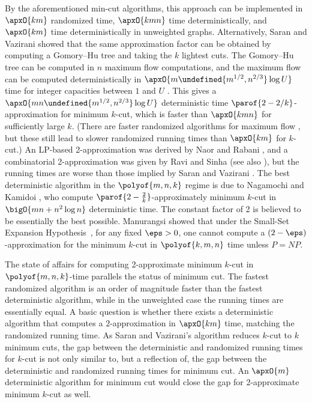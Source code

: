 \documentclass[11pt]{article}
\numberwithin{equation}{section}
\theoremstyle{definition}
\theoremstyle{plain}
\let\minof\undefined\usepackage{math} %
\begin{document}
By the aforementioned min-cut algorithms, this approach can be
implemented in $\apxO{k m}$ randomized time, $\apxO{k m n}$ time
deterministically, and $\apxO{k m}$ time deterministically in
unweighted graphs. Alternatively, Saran and Vazirani \cite{sv-95}
showed that the same approximation factor can be obtained by computing
a Gomory--Hu tree and taking the $k$ lightest cuts. The Gomory--Hu
tree can be computed in $n$ maximum flow computations, and the maximum
flow can be computed deterministically in
\begin{math}
  \apxO{m \minof{m^{1/2}, n^{2/3}} \log U}
\end{math}
time for integer capacities between $1$ and $U$ \cite{gr-98}. This
gives a $\apxO{m n \minof{m^{1/2}, n^{2/3}} \log U}$ deterministic time
$\parof{2 - 2/k}$-approximation for minimum $k$-cut, which is faster
than $\apxO{k m n}$ for sufficiently large $k$. (There are faster
randomized algorithms for maximum flow \cite{ls-14,madry-16}, but
these still lead to slower randomized running times than $\apxO{k m}$
for $k$-cut.) An %
LP-based  %
2-approximation was derived by Naor and
Rabani \cite{nr-01}, and a combinatorial 2-approximation was given by
Ravi and Sinha \cite{rs-08} (see also \cite{barahona-00}), but the
running times are worse than those implied by Saran and Vazirani
\cite{sv-95}. The best deterministic algorithm in the
%
$\polyof{m,n,k}$ %
regime is due to Nagamochi and Kamidoi \cite{nk}, who compute
$\parof{2 - \frac{2}{k}}$-approximately minimum
%
$k$-cut in   %
$\bigO{m n + n^2 \log n}$ deterministic time. The constant factor of 2
is believed to be essentially the best possible.  Manurangsi
\cite{manurangsi-17} showed that under the
%
Small-Set Expansion Hypothesis~\cite{RS10}, %
%
%
for any fixed $\eps > 0$, one cannot compute a
$(2-\eps)$-approximation for the minimum $k$-cut in $\polyof{k,m,n}$
time unless $P = NP$.

The state of affairs for computing 2-approximate minimum
     $k$-cut  %
in $\polyof{m,n,k}$-time parallels the status of minimum cut. The fastest
randomized algorithm is an order of magnitude faster than the fastest
deterministic algorithm, while in the unweighted case the running
times are essentially equal. A basic question is whether there exists
a deterministic algorithm that computes a $2$-approximation in
$\apxO{k m}$ time, matching the randomized running time. As
Saran and Vazirani's algorithm reduces $k$-cut to $k$ minimum cuts,
the gap between the deterministic and randomized running times for
$k$-cut is not only similar to, but a reflection of, the gap between
the deterministic and randomized running times for minimum cut. An
$\apxO{m}$ deterministic algorithm for minimum cut would close the gap
for 2-approximate
minimum  %
$k$-cut as well.
\end{document}
